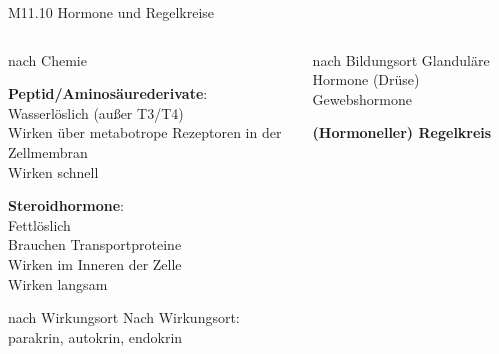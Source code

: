 \documentclass{beamer}
\begin{document}



\begin{frame}{M11.10 Hormone und Regelkreise}


\begin{columns}[c]

\begin{column}{5cm}

\begin{block}{nach Chemie}

 \textbf{Peptid/Aminosäurederivate}: \\
 Wasserlöslich (außer T3/T4) \\
 Wirken über metabotrope Rezeptoren in der Zellmembran  \\
 Wirken schnell
 
\textbf{Steroidhormone}: \\
Fettlöslich \\
Brauchen Transportproteine \\
Wirken im Inneren der Zelle \\
Wirken langsam \\


\end{block}

\begin{block}{nach Wirkungsort}
Nach Wirkungsort: parakrin, autokrin, endokrin
\end{block}



\end{column}


\begin{column}{6cm}

\begin{block}{nach Bildungsort}
Glanduläre Hormone (Drüse) \\
Gewebshormone
\end{block}

\pause

\textbf{(Hormoneller) Regelkreis}


\end{column}
\end{columns}
\end{frame}
\end{document}
